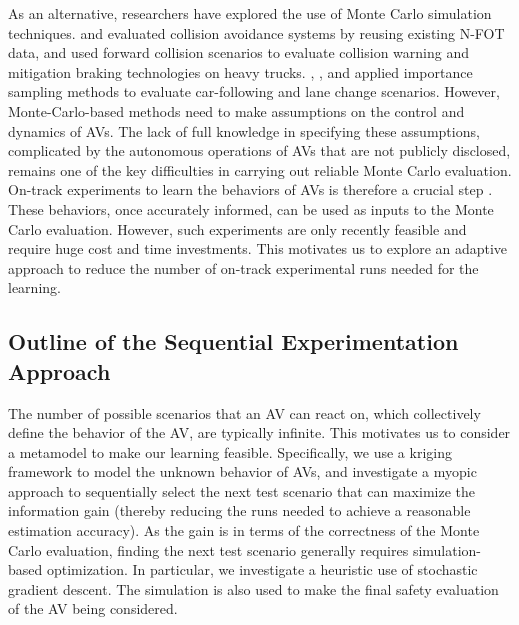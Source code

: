 \documentclass{wscpaperproc}
\theoremstyle{wsc}
\begin{document}
As an alternative, researchers have explored the use of Monte Carlo simulation techniques.  and  evaluated collision avoidance systems by reusing existing N-FOT data, and  used forward collision scenarios to evaluate collision warning and mitigation braking technologies on heavy trucks. , , and  applied importance sampling methods to evaluate car-following and lane change scenarios. However,  Monte-Carlo-based methods need to make assumptions on the control and dynamics of AVs. The lack of full knowledge in specifying these assumptions, complicated by the autonomous operations of AVs that are not publicly disclosed, remains one of the key difficulties in carrying out reliable Monte Carlo evaluation. On-track experiments to learn the behaviors of AVs is therefore a crucial step \cite{peng2012evaluation}. These behaviors, once accurately informed, can be used as inputs to the Monte Carlo evaluation. However, such experiments are only recently feasible \cite{mcity} and require huge cost and time investments. This motivates us to explore an adaptive approach to reduce the number of on-track experimental runs needed for the learning. 



\subsection{Outline of the Sequential Experimentation Approach}

The number of possible scenarios that an AV can react on, which collectively define the behavior of the AV, are typically infinite. This motivates us to consider a metamodel to make our learning feasible. Specifically, we use a kriging framework to model the unknown behavior of AVs, and investigate a myopic approach to sequentially select the next test scenario that can maximize the information gain (thereby reducing the runs needed to achieve a reasonable estimation accuracy). As the gain is in terms of the correctness of the Monte Carlo evaluation, finding the next test scenario generally requires simulation-based optimization. In particular, we investigate a heuristic use of stochastic gradient descent. The simulation is also used to make the final safety evaluation of the AV being considered.
\end{document}
